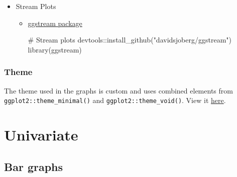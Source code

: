 \documentclass[
  letterpaper,
  DIV=11,
  numbers=noendperiod,
  oneside]{scrreprt}
\newenvironment{Shaded}{\begin{snugshade}}{\end{snugshade}}
\newcommand{\CommentTok}[1]{\textcolor[rgb]{0.37,0.37,0.37}{#1}}
\newcommand{\FunctionTok}[1]{\textcolor[rgb]{0.28,0.35,0.67}{#1}}
\newcommand{\NormalTok}[1]{\textcolor[rgb]{0.00,0.23,0.31}{#1}}
\newcommand{\SpecialCharTok}[1]{\textcolor[rgb]{0.37,0.37,0.37}{#1}}
\newcommand{\StringTok}[1]{\textcolor[rgb]{0.13,0.47,0.30}{#1}}
\begin{document}
\begin{itemize}
\begin{itemize}
\begin{Shaded}
\begin{Highlighting}[]
\CommentTok{\# Bump charts}
\NormalTok{devtools}\SpecialCharTok{::}\FunctionTok{install\_github}\NormalTok{(}\StringTok{"thomasp85/ggforce"}\NormalTok{)}
\FunctionTok{library}\NormalTok{(ggforce)}
\end{Highlighting}
\end{Shaded}
  \end{itemize}
\item[$\boxtimes$]
  Stream Plots

  \begin{itemize}
  \item
    \href{https://github.com/davidsjoberg/ggstream}{ggstream package}

\begin{Shaded}
\begin{Highlighting}[]
\CommentTok{\# Stream plots}
\NormalTok{devtools}\SpecialCharTok{::}\FunctionTok{install\_github}\NormalTok{(}\StringTok{"davidsjoberg/ggstream"}\NormalTok{)}
\FunctionTok{library}\NormalTok{(ggstream)}
\end{Highlighting}
\end{Shaded}
  \end{itemize}
\end{itemize}

\hypertarget{theme}{%
\section*{Theme}\label{theme}}

The theme used in the graphs is custom and uses combined elements from
\texttt{ggplot2::theme\_minimal()} and \texttt{ggplot2::theme\_void()}.
View it
\href{https://github.com/mjfrigaard/ggp2-gallery/blob/main/R/theme_ggp2g.R}{here}.

\part{Univariate}

\hypertarget{bar-graphs}{%
\chapter*{Bar graphs}\label{bar-graphs}}
\end{document}
